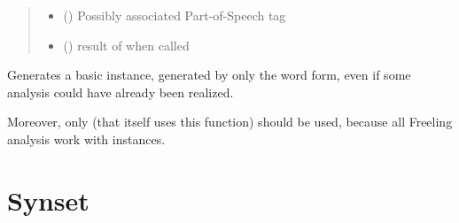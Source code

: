 \documentclass[letterpaper,10pt,english]{sphinxmanual}
\begin{document}
\begin{fulllineitems}
\begin{quote}
\begin{description}
\begin{itemize}
\item {} 
 () \textendash{} Possibly associated Part-of-Speech tag

\item {} 
 () \textendash{} result of {\hyperref[\detokenize{index:loacore.classes.classes.Word.compute_freeling_word}]{}} when called

\end{itemize}

\end{description}\end{quote}

\begin{fulllineitems}
\label{\detokenize{index:loacore.classes.classes.Word.compute_freeling_word}}
Generates a basic  instance, generated by only the word form, even if some analysis
could have already been realized.

Moreover, only  (that itself uses this function) should be used,
because all Freeling analysis work with  instances.

\end{fulllineitems}


\end{fulllineitems}



\section{Synset}
\label{\detokenize{index:synset}}
\end{document}
